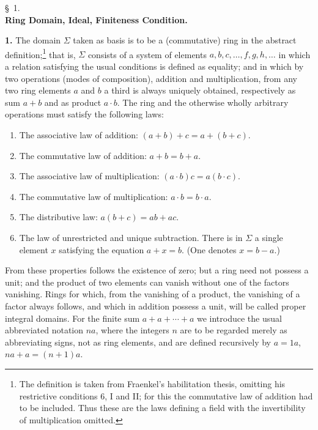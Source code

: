 \documentclass[11pt]{article}
\begin{document}
\begin{center}
\S~1.\\[0.25em]
\textbf{Ring Domain, Ideal, Finiteness Condition.}
\end{center}

\textbf{1.} The domain $\Sigma$ taken as basis is to be a (commutative) ring in the abstract definition;\footnote{The definition is taken from Fraenkel's habilitation thesis, omitting his restrictive conditions 6, I and II; for this the commutative law of addition had to be included. Thus these are the laws defining a field with the invertibility of multiplication omitted.} that is, $\Sigma$ consists of a system of elements $a,b,c,\ldots,f,g,h,\ldots$ in which a relation satisfying the usual conditions is defined as equality; and in which by two operations (modes of composition), addition and multiplication, from any two ring elements $a$ and $b$ a third is always uniquely obtained, respectively as sum $a+b$ and as product $a\cdot b$. The ring and the otherwise wholly arbitrary operations must satisfy the following laws:
\begin{enumerate}
\item The associative law of addition: $(a+b)+c=a+(b+c)$.
\item The commutative law of addition: $a+b=b+a$.
\item The associative law of multiplication: $(a\cdot b)c=a(b\cdot c)$.
\item The commutative law of multiplication: $a\cdot b=b\cdot a$.
\item The distributive law: $a(b+c)=ab+ac$.
\item The law of unrestricted and unique subtraction. There is in $\Sigma$ a single element $x$ satisfying the equation $a+x=b$. (One denotes $x=b-a$.)
\end{enumerate}
From these properties follows the existence of zero; but a ring need not possess a unit; and the product of two elements can vanish without one of the factors vanishing. Rings for which, from the vanishing of a product, the vanishing of a factor always follows, and which in addition possess a unit, will be called proper integral domains. For the finite sum $a+a+\cdots+a$ we introduce the usual abbreviated notation $na$, where the integers $n$ are to be regarded merely as abbreviating signs, not as ring elements, and are defined recursively by $a=1a$, $na+a=(n+1)a$.
\end{document}
